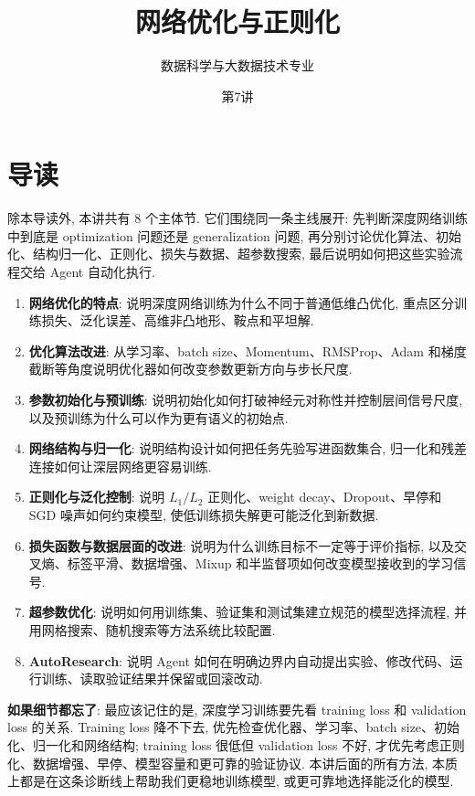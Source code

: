 \documentclass{../nndlcourse}
\begin{document}
\title{网络优化与正则化}
\author{数据科学与大数据技术专业}
\date{第7讲 }
\maketitle

\section{导读}

除本导读外, 本讲共有 8 个主体节. 它们围绕同一条主线展开: 先判断深度网络训练中到底是 optimization 问题还是 generalization 问题, 再分别讨论优化算法、初始化、结构归一化、正则化、损失与数据、超参数搜索, 最后说明如何把这些实验流程交给 Agent 自动化执行.

\begin{enumerate}
  \item \textbf{网络优化的特点}: 说明深度网络训练为什么不同于普通低维凸优化, 重点区分训练损失、泛化误差、高维非凸地形、鞍点和平坦解.
  \item \textbf{优化算法改进}: 从学习率、batch size、Momentum、RMSProp、Adam 和梯度截断等角度说明优化器如何改变参数更新方向与步长尺度.
  \item \textbf{参数初始化与预训练}: 说明初始化如何打破神经元对称性并控制层间信号尺度, 以及预训练为什么可以作为更有语义的初始点.
  \item \textbf{网络结构与归一化}: 说明结构设计如何把任务先验写进函数集合, 归一化和残差连接如何让深层网络更容易训练.
  \item \textbf{正则化与泛化控制}: 说明 $L_1/L_2$ 正则化、weight decay、Dropout、早停和 SGD 噪声如何约束模型, 使低训练损失解更可能泛化到新数据.
  \item \textbf{损失函数与数据层面的改进}: 说明为什么训练目标不一定等于评价指标, 以及交叉熵、标签平滑、数据增强、Mixup 和半监督项如何改变模型接收到的学习信号.
  \item \textbf{超参数优化}: 说明如何用训练集、验证集和测试集建立规范的模型选择流程, 并用网格搜索、随机搜索等方法系统比较配置.
  \item \textbf{AutoResearch}: 说明 Agent 如何在明确边界内自动提出实验、修改代码、运行训练、读取验证结果并保留或回滚改动.
\end{enumerate}

 \textbf{如果细节都忘了}: 最应该记住的是, 深度学习训练要先看 training loss 和 validation loss 的关系. Training loss 降不下去, 优先检查优化器、学习率、batch size、初始化、归一化和网络结构; training loss 很低但 validation loss 不好, 才优先考虑正则化、数据增强、早停、模型容量和更可靠的验证协议. 本讲后面的所有方法, 本质上都是在这条诊断线上帮助我们更稳地训练模型, 或更可靠地选择能泛化的模型.
\end{document}
